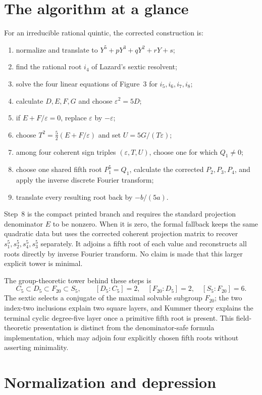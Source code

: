 \documentclass[11pt,a4paper,oneside]{article}
\newcommand{\eps}{\varepsilon}
\newcommand{\ii}[1]{i_{#1}}
\begin{document}
\section{The algorithm at a glance}

For an irreducible rational quintic, the corrected construction is:

\begin{enumerate}
\item normalize and translate to $Y^5+pY^3+qY^2+rY+s$;
\item find the rational root $\ii4$ of Lazard's sextic resolvent;
\item solve the four linear equations of Figure~3 for
  $\ii5,\ii6,\ii7,\ii8$;
\item calculate $D,E,F,G$ and choose $\eps^2=5D$;
\item if $E+F/\eps=0$, replace $\eps$ by $-\eps$;
\item choose $T^2=\frac52(E+F/\eps)$ and set $U=5G/(T\eps)$;
\item among four coherent sign triples $(\eps,T,U)$, choose one for which
  $Q_1\ne0$;
\item choose one shared fifth root $P_1^5=Q_1$, calculate the corrected
  $P_2,P_3,P_4$, and apply the inverse discrete Fourier transform;
\item translate every resulting root back by $-b/(5a)$.
\end{enumerate}

Step~8 is the compact printed branch and requires the standard projection
denominator $E$ to be nonzero.  When it is zero, the formal fallback keeps the
same quadratic data but uses the corrected coherent projection matrix to
recover $s_1^5,s_2^5,s_4^5,s_3^5$ separately.  It adjoins a fifth root of each
value and reconstructs all roots directly by inverse Fourier transform.  No
claim is made that this larger explicit tower is minimal.

The group-theoretic tower behind these steps is
\[
 C_5\subset D_5\subset F_{20}\subset S_5,
 \qquad [D_5:C_5]=2,\quad [F_{20}:D_5]=2,\quad [S_5:F_{20}]=6.
\]
The sextic selects a conjugate of the maximal solvable subgroup $F_{20}$;
the two index-two inclusions explain two square layers, and Kummer theory
explains the terminal cyclic degree-five layer once a primitive fifth root is
present.  This field-theoretic presentation is distinct from the
denominator-safe formula implementation, which may adjoin four explicitly
chosen fifth roots without asserting minimality.

\section{Normalization and depression}
\end{document}
